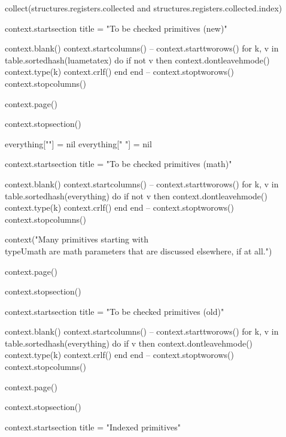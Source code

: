         collect(structures.registers.collected and structures.registers.collected.index)

        context.startsection { title = "To be checked primitives (new)" }

        context.blank()
        context.startcolumns()
     -- context.starttworows()
        for k, v in table.sortedhash(luametatex) do
            if not v then
                context.dontleavehmode()
                context.type(k)
                context.crlf()
            end
        end
     -- context.stoptworows()
        context.stopcolumns()

        context.page()

        context.stopsection()

        everything[""]  = nil
        everything[" "] = nil

        context.startsection { title = "To be checked primitives (math)" }

        context.blank()
        context.startcolumns()
     -- context.starttworows()
        for k, v in table.sortedhash(everything) do
            if not v then
                context.dontleavehmode()
                context.type(k)
                context.crlf()
            end
        end
     -- context.stoptworows()
        context.stopcolumns()

        context("Many primitives starting with \\type{Umath} are math parameters that are discussed elsewhere, if at all.")

        context.page()

        context.stopsection()

        context.startsection { title = "To be checked primitives (old)" }

        context.blank()
        context.startcolumns()
     -- context.starttworows()
        for k, v in table.sortedhash(everything) do
            if v then
                context.dontleavehmode()
                context.type(k)
                context.crlf()
            end
        end
     -- context.stoptworows()
        context.stopcolumns()

        context.page()

        context.stopsection()

        context.startsection { title = "Indexed primitives" }

